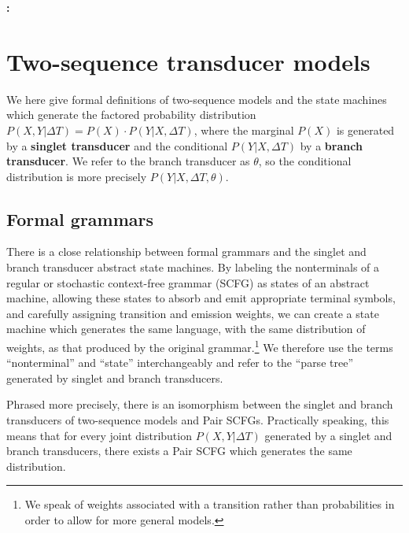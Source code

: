 \documentclass[10pt]{article}
\date{}
\begin{document}
\begin{flushleft}
  {\Large
    \textbf{\titlestring: }
  }
\\
\authorstring
\end{flushleft}


\newpage
\tableofcontents


\newpage
\section{Two-sequence transducer models}

We here give formal definitions of two-sequence models and the state machines which
generate the factored probability distribution $P (X, Y | \Delta T) = P (X) \cdot P (Y | X, \Delta T)$,
where the marginal $P(X)$ is generated by a {\bf singlet transducer}
and the conditional $P (Y | X, \Delta T)$ by a {\bf branch transducer}.
We refer to the branch transducer as $\theta$, so the conditional distribution
is more precisely $P (Y | X, \Delta T, \theta)$.


\subsection{Formal grammars} 

There is a close relationship between formal grammars and the singlet and branch transducer abstract state machines.
By labeling the nonterminals of a regular or stochastic context-free grammar (SCFG) as states of an abstract machine, allowing these states to absorb and emit 
appropriate terminal symbols, and carefully assigning transition and emission weights,
we can create a state machine which generates the same language, with the same distribution of weights, as that produced by the original grammar.\footnote{We speak of
weights associated with a transition rather than probabilities in order to allow for more general models.}
We therefore use the terms ``nonterminal'' and ``state'' interchangeably
and refer to the ``parse tree'' generated by singlet and branch transducers.

Phrased more precisely, there is an isomorphism between the singlet and branch transducers of two-sequence models
and Pair SCFGs.  Practically speaking, this means that for every joint distribution $P(X, Y | \Delta T)$ 
generated by a singlet and branch transducers, there exists a Pair SCFG which generates the same distribution.
\end{document}
